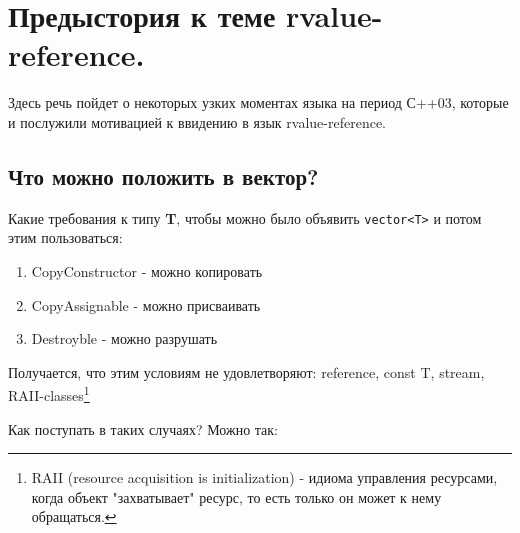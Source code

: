 \section{Предыстория к теме rvalue-reference.}
Здесь речь пойдет о некоторых узких моментах языка на период С++03, которые и послужили мотивацией к ввидению в язык rvalue-reference.
\subsection{Что можно положить в вектор?}
Какие требования к типу {\bf T}, чтобы можно было объявить \texttt{vector<T>} и потом этим пользоваться:
\begin{enumerate}
\item CopyConstructor - можно копировать
\item CopyAssignable - можно присваивать
\item Destroyble - можно разрушать
\end{enumerate}
Получается, что этим условиям не удовлетворяют: reference, const T, stream, RAII-classes\footnote{ RAII (resource acquisition is initialization) - идиома управления ресурсами, когда объект "захватывает" ресурс, то есть только он может к нему обращаться.}


Как поступать в таких случаях? Можно так:

